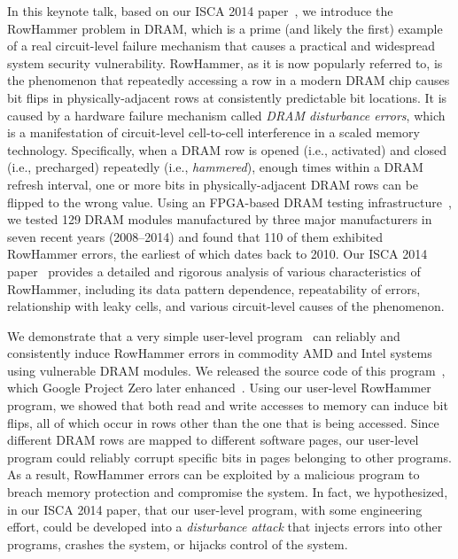 \documentclass[runningheads]{llncs}
\begin{document}
In this keynote talk, based on our ISCA 2014
paper~\cite{rowhammer-isca2014}, we introduce the RowHammer problem in
DRAM, which is a prime (and likely the first) example of a real
circuit-level failure mechanism that causes a practical and widespread
system security vulnerability. RowHammer, as it is now popularly
referred to, is the phenomenon that repeatedly accessing a row in a
modern DRAM chip causes bit flips in physically-adjacent rows at
consistently predictable bit locations. It is caused by a hardware
failure mechanism called {\em DRAM disturbance errors}, which is a
manifestation of circuit-level cell-to-cell interference in a scaled
memory technology. Specifically, when a DRAM row is opened (i.e.,
activated) and closed (i.e., precharged) repeatedly (i.e., {\em
  hammered}), enough times within a DRAM refresh interval, one or more
bits in physically-adjacent DRAM rows can be flipped to the wrong
value. Using an FPGA-based DRAM testing
infrastructure~\cite{dram-isca2013,softmc}, we tested 129 DRAM modules
manufactured by three major manufacturers in seven recent years
(2008--2014) and found that 110 of them exhibited RowHammer errors,
the earliest of which dates back to 2010. Our ISCA 2014
paper~\cite{rowhammer-isca2014} provides a detailed and rigorous
analysis of various characteristics of RowHammer, including its data
pattern dependence, repeatability of errors, relationship with leaky
cells, and various circuit-level causes of the phenomenon.
  
We demonstrate that a very simple user-level
program~\cite{rowhammer-isca2014,safari-rowhammer} can reliably and
consistently induce RowHammer errors in commodity AMD and Intel
systems using vulnerable DRAM modules. We released the source code of
this program~\cite{safari-rowhammer}, which Google Project Zero later
enhanced~\cite{google-rowhammer-test}. Using our user-level RowHammer
program, we showed that both read and write accesses to memory can
induce bit flips, all of which occur in rows other than the one that
is being accessed. Since different DRAM rows are mapped to different
software pages, our user-level program could reliably corrupt specific
bits in pages belonging to other programs. As a result, RowHammer
errors can be exploited by a malicious program to breach memory
protection and compromise the system. In fact, we hypothesized, in our
ISCA 2014 paper, that our user-level program, with some engineering
effort, could be developed into a {\em disturbance attack} that
injects errors into other programs, crashes the system, or hijacks
control of the system.
\end{document}
